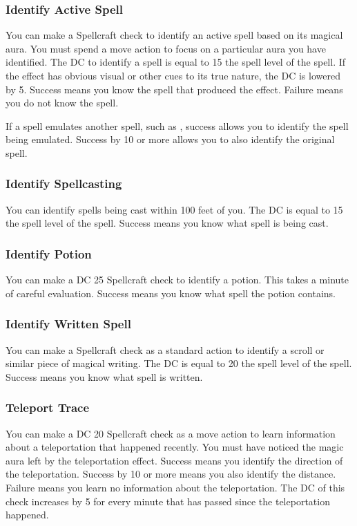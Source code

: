 \subsubsection{Identify Active Spell}
You can make a Spellcraft check to identify an active spell based on its magical aura. You must spend a move action to focus on a particular aura you have identified. The DC to identify a spell is equal to 15 \add the spell level of the spell.  If the effect has obvious visual or other cues to its true nature, the DC is lowered by 5. Success means you know the spell that produced the effect. Failure means you do not know the spell.

If a spell emulates another spell, such as , success allows you to identify the spell being emulated. Success by 10 or more allows you to also identify the original spell. 

\subsubsection{Identify Spellcasting}
You can identify spells being cast within 100 feet of you. The DC is equal to 15 \add the spell level of the spell. Success means you know what spell is being cast.

\subsubsection{Identify Potion}
You can make a DC 25 Spellcraft check to identify a potion. This takes a minute of careful evaluation. Success means you know what spell the potion contains.

\subsubsection{Identify Written Spell}
You can make a Spellcraft check as a standard action to identify a scroll or similar piece of magical writing. The DC is equal to 20 \add the spell level of the spell. Success means you know what spell is written.

\subsubsection{Teleport Trace}
You can make a DC 20 Spellcraft check as a move action to learn information about a teleportation that happened recently. You must have noticed the magic aura left by the teleportation effect. Success means you identify the direction of the teleportation. Success by 10 or more means you also identify the distance. Failure means you learn no information about the teleportation. The DC of this check increases by 5 for every minute that has passed since the teleportation happened.

